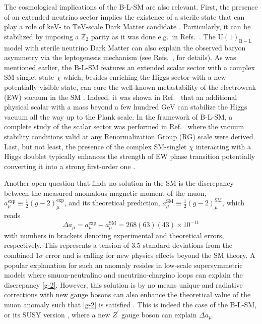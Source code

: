 \documentclass[a4paper,11pt]{article}
\renewcommand{\(}{\left(}
\renewcommand{\)}{\right)}
\renewcommand{\[}{\left[}
\renewcommand{\]}{\right]}
\newcommand{\U}[1]{\mathrm{U}(1)_{\mathrm{#1}}}			%
\newcommand{\ro}[1]{\textrm{#1}}
\begin{document}
The cosmological implications of the B-L-SM are also relevant. First, the presence of an extended neutrino sector implies the existence of a sterile state that can play a role of $\ro{keV}$- to $\ro{TeV}$-scale Dark Matter candidate \cite{Kaneta:2016vkq}. Particularly, it can be stabilized by imposing a $\mathbb{Z}_2$ parity as it was done e.g.~in Refs.~\cite{Okada:2010wd,Okada:2018ktp}. The $\U{B-L}$ model with sterile neutrino Dark Matter can also explain the observed baryon asymmetry via the leptogenesis mechanism (see Refs.~\cite{Fukugita:1986hr,Pilaftsis:1997jf,Pilaftsis:2003gt}, for details). As was mentioned earlier, the B-L-SM features an extended scalar sector with a complex SM-singlet state $\chi$ which, besides enriching the Higgs sector with a new potentially visible state, can cure the well-known metastability of the electroweak (EW) vacuum in the SM \cite{Degrassi:2012ry,Alekhin:2012py,Buttazzo:2013uya}. Indeed, it was shown in Ref.~\cite{Costa:2014qga} that an additional physical scalar with a mass beyond a few hundred $\ro{GeV}$ can stabilize the Higgs vacuum all the way up to the Plank scale. In the framework of B-L-SM, a complete study of the scalar sector was performed in Ref.~\cite{Basso:2010jm} where the vacuum stability conditions valid at any Renormalization Group (RG) scale were derived. Last, but not least, the presence of the complex SM-singlet $\chi$ interacting with a Higgs doublet typically enhances the strength of EW phase transition potentially converting it into a strong first-order one \cite{Barger:2008jx}.

Another open question that finds no solution in the SM is the discrepancy between the measured anomalous magnetic moment of the muon, $a_\mu^\ro{exp} \equiv \tfrac{1}{2} \(g-2\)^\ro{exp}_\mu$, and its theoretical prediction, $a_\mu^\ro{SM} \equiv \tfrac{1}{2} \(g-2\)^\ro{SM}_\mu$, which reads \cite{Tanabashi:2018oca}
\begin{equation}
	\label{g-2}
	\Delta a_\mu = a_\mu^\ro{exp} - a_\mu^\ro{SM} = 268(63)(43) \times 10^{-11}
\end{equation}
with numbers in brackets denoting experimental and theoretical errors, respectively. This represents a tension of $3.5$ standard deviations from the combined $1 \sigma$ error and is calling for new physics effects beyond the SM theory. A popular explanation for such an anomaly resides in low-scale supersymmetric models \cite{Belyaev:2016oxy,Grifols:1982vx,Ellis:1982by,Kosower:1983yw,Yuan:1984ww,Romao:1984pn,Cho:2011rk,Okada:2013ija,Endo:2013lva,Gogoladze:2014cha,Wang:2015rli} where smuon-neutralino and sneutrino-chargino loops can explain the discrepancy \eqref{g-2}. However, this solution is by no means unique and radiative corrections with new gauge bosons can also enhance the theoretical value of the muon anomaly such that \eqref{g-2} is satisfied \cite{Czarnecki:2001pv}. This is indeed the case of the B-L-SM, or its SUSY version \cite{Khalil:2015wua,Yang:2018guw}, where a new $Z^\prime$ gauge boson can explain $\Delta a_\mu$. 
\end{document}
